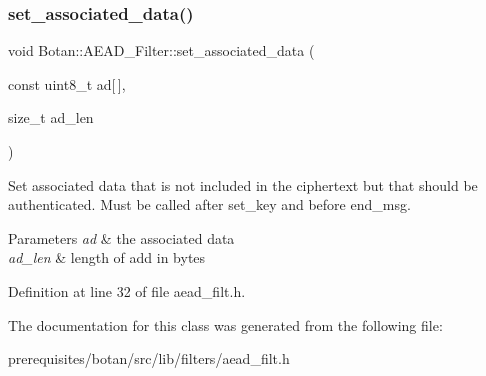 \subsubsection{\texorpdfstring{set\+\_\+associated\+\_\+data()}{set\_associated\_data()}}
{\footnotesize\ttfamily void Botan\+::\+A\+E\+A\+D\+\_\+\+Filter\+::set\+\_\+associated\+\_\+data (\begin{DoxyParamCaption}\item[{const uint8\+\_\+t}]{ad\mbox{[}$\,$\mbox{]},  }\item[{size\+\_\+t}]{ad\+\_\+len }\end{DoxyParamCaption})\hspace{0.3cm}{\ttfamily [inline]}}

Set associated data that is not included in the ciphertext but that should be authenticated. Must be called after set\+\_\+key and before end\+\_\+msg.


\begin{DoxyParams}{Parameters}
{\em ad} & the associated data \\
\hline
{\em ad\+\_\+len} & length of add in bytes \\
\hline
\end{DoxyParams}


Definition at line 32 of file aead\+\_\+filt.\+h.



The documentation for this class was generated from the following file\+:\begin{DoxyCompactItemize}
\item 
prerequisites/botan/src/lib/filters/aead\+\_\+filt.\+h\end{DoxyCompactItemize}
